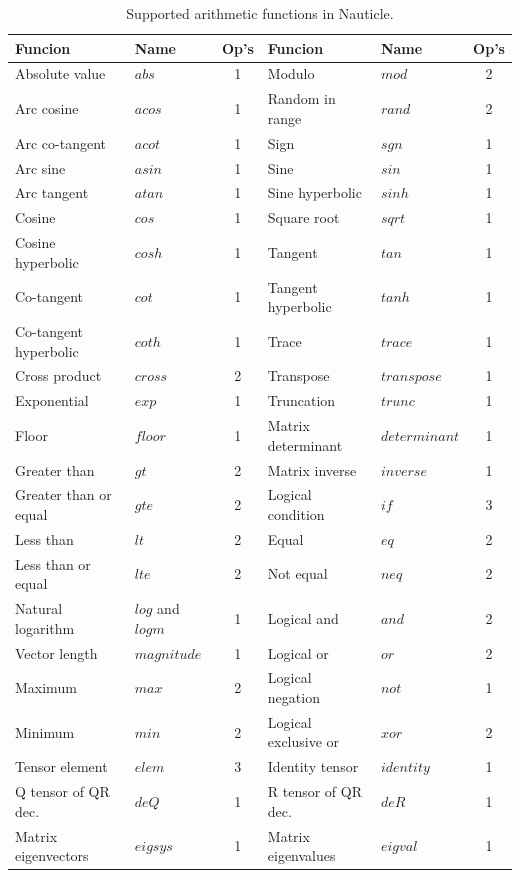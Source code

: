 \documentclass[a4paper,12pt,openany]{book}
\theoremstyle{break}
\begin{document}
\begin{table} [H]
\begin{center}
\caption{Supported arithmetic functions in Nauticle.}\label{tbl:arfc}
\begin{tabular}{ l l c | l l c }
\toprule[1.5pt]
\bf Funcion & \bf Name & \bf Op's & \bf Funcion & \bf Name & \bf Op's\\ 
\midrule
Absolute value & $abs$ & 1 & Modulo & $mod$ & 2 \\
Arc cosine & $acos$ & 1 & Random in range & $rand$ & 2 \\
Arc co-tangent & $acot$ & 1 & Sign & $sgn$ & 1 \\
Arc sine & $asin$ & 1 & Sine & $sin$ & 1 \\
Arc tangent & $atan$ & 1 & Sine hyperbolic & $sinh$ & 1 \\
Cosine & $cos$ & 1 & Square root & $sqrt$ & 1 \\
Cosine hyperbolic & $cosh$ & 1 & Tangent & $tan$ & 1 \\
Co-tangent & $cot$ & 1 & Tangent hyperbolic & $tanh$ & 1 \\
Co-tangent hyperbolic & $coth$ & 1 & Trace & $trace$ & 1 \\
Cross product & $cross$ & 2 & Transpose & $transpose$ & 1 \\
Exponential & $exp$ & 1 & Truncation & $trunc$ & 1 \\
Floor & $floor$ & 1 & Matrix determinant & $determinant$ & 1 \\
Greater than & $gt$ & 2 & Matrix inverse & $inverse$ & 1 \\
Greater than or equal & $gte$ & 2 & Logical condition & $if$ & 3 \\
Less than & $lt$ & 2 & Equal & $eq$ & 2 \\
Less than or equal & $lte$ & 2 & Not equal & $neq$ & 2 \\
Natural logarithm & $log$ and $logm$ & 1 & Logical and & $and$ & 2 \\
Vector length & $magnitude$ & 1 & Logical or & $or$ & 2 \\
Maximum & $max$ & 2 & Logical negation & $not$ & 1 \\
Minimum & $min$ & 2 & Logical exclusive or & $xor$ & 2 \\
Tensor element & $elem$ & 3 & Identity tensor & $identity$ & 1 \\
Q tensor of QR dec. & $deQ$ & 1 & R tensor of QR dec. & $deR$ & 1 \\ 
Matrix eigenvectors & $eigsys$ & 1 & Matrix eigenvalues & $eigval$ & 1 \\
\bottomrule[1.25pt]
\end{tabular}
\end{center}
\end{table}
\end{document}
